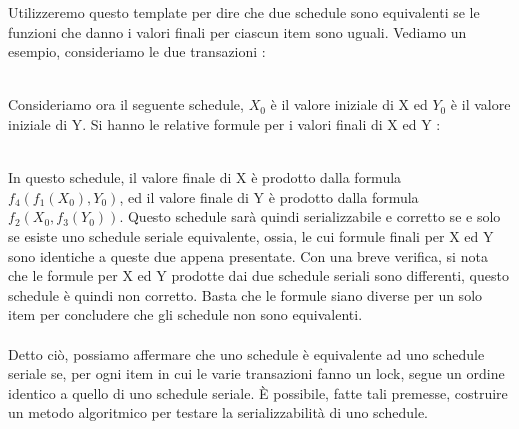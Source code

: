 \documentclass[12pt, letterpaper]{article}
\newcommand{\acc}{\\\hphantom{}\\}
\begin{document}
Utilizzeremo questo template per dire che due schedule sono equivalenti se le funzioni che danno i valori 
finali per ciascun item sono uguali. Vediamo un esempio, consideriamo le due transazioni :\begin{figure}[h]
\end{figure}\\
Consideriamo ora il seguente schedule, \(X_0\) è il valore iniziale di X ed \(Y_0\) è il 
valore iniziale di Y. Si hanno le relative formule per i valori finali di X ed Y :
\begin{figure}[h]
\end{figure}\\
In questo schedule, il valore finale di X è prodotto dalla formula \(f_4(f_1(X_0),Y_0) \), ed il valore finale di 
Y è prodotto dalla formula \(f_2(X_0,f_3(Y_0)) \). Questo schedule sarà quindi serializzabile e corretto se e solo se 
esiste uno schedule seriale equivalente, ossia, le cui formule finali per X ed Y sono identiche a queste due appena presentate. Con 
una breve verifica, si nota che le formule per X ed Y prodotte dai due schedule seriali sono differenti, questo schedule è 
quindi non corretto. Basta che le formule siano diverse per un solo item per concludere che gli schedule non sono equivalenti.\acc 
Detto ciò, possiamo affermare che uno schedule è equivalente ad uno schedule seriale se, per ogni item in cui le 
varie transazioni fanno un lock, segue un ordine identico a quello di uno schedule seriale. È possibile, fatte tali premesse, 
costruire un metodo algoritmico per testare la serializzabilità di uno schedule.
\end{document}
